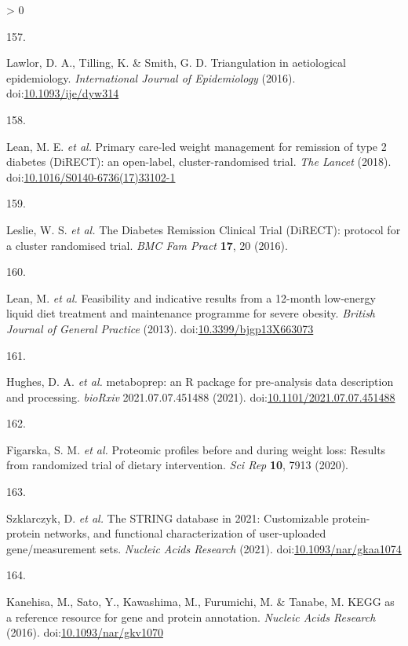 \documentclass[11pt,twoside]{bristolthesis}
\newlength{\cslhangindent}
\newlength{\csllabelwidth}
\newenvironment{CSLReferences}[2] %
 {%
  \setlength{\parindent}{0pt}
  \ifodd #1 \everypar{\setlength{\hangindent}{\cslhangindent}}\ignorespaces\fi
  \ifnum #2 > 0
  \setlength{\parskip}{#2\baselineskip}
  \fi
 }%
 {}
\newcommand{\CSLLeftMargin}[1]{\parbox[t]{\csllabelwidth}{#1}}
\newcommand{\CSLRightInline}[1]{\parbox[t]{\linewidth - \csllabelwidth}{#1}\break}
\begin{document}
\begin{CSLReferences}{0}{0}
\leavevmode\hypertarget{ref-Lawlor2016}{}%
\CSLLeftMargin{157. }
\CSLRightInline{Lawlor, D. A., Tilling, K. \& Smith, G. D. {Triangulation in aetiological epidemiology}. \emph{International Journal of Epidemiology} (2016). doi:\href{https://doi.org/10.1093/ije/dyw314}{10.1093/ije/dyw314}}

\leavevmode\hypertarget{ref-Lean2018}{}%
\CSLLeftMargin{158. }
\CSLRightInline{Lean, M. E. \emph{et al.} {Primary care-led weight management for remission of type 2 diabetes (DiRECT): an open-label, cluster-randomised trial}. \emph{The Lancet} (2018). doi:\href{https://doi.org/10.1016/S0140-6736(17)33102-1}{10.1016/S0140-6736(17)33102-1}}

\leavevmode\hypertarget{ref-Leslie2016}{}%
\CSLLeftMargin{159. }
\CSLRightInline{Leslie, W. S. \emph{et al.} {The Diabetes Remission Clinical Trial (DiRECT): protocol for a cluster randomised trial}. \emph{BMC Fam Pract} \textbf{17}, 20 (2016).}

\leavevmode\hypertarget{ref-Lean2013}{}%
\CSLLeftMargin{160. }
\CSLRightInline{Lean, M. \emph{et al.} {Feasibility and indicative results from a 12-month low-energy liquid diet treatment and maintenance programme for severe obesity}. \emph{British Journal of General Practice} (2013). doi:\href{https://doi.org/10.3399/bjgp13X663073}{10.3399/bjgp13X663073}}

\leavevmode\hypertarget{ref-Hughes2021}{}%
\CSLLeftMargin{161. }
\CSLRightInline{Hughes, D. A. \emph{et al.} {metaboprep: an R package for pre-analysis data description and processing}. \emph{bioRxiv} 2021.07.07.451488 (2021). doi:\href{https://doi.org/10.1101/2021.07.07.451488}{10.1101/2021.07.07.451488}}

\leavevmode\hypertarget{ref-Figarska2020}{}%
\CSLLeftMargin{162. }
\CSLRightInline{Figarska, S. M. \emph{et al.} {Proteomic profiles before and during weight loss: Results from randomized trial of dietary intervention}. \emph{Sci Rep} \textbf{10}, 7913 (2020).}

\leavevmode\hypertarget{ref-Szklarczyk2021}{}%
\CSLLeftMargin{163. }
\CSLRightInline{Szklarczyk, D. \emph{et al.} {The STRING database in 2021: Customizable protein-protein networks, and functional characterization of user-uploaded gene/measurement sets}. \emph{Nucleic Acids Research} (2021). doi:\href{https://doi.org/10.1093/nar/gkaa1074}{10.1093/nar/gkaa1074}}

\leavevmode\hypertarget{ref-Kanehisa2016}{}%
\CSLLeftMargin{164. }
\CSLRightInline{Kanehisa, M., Sato, Y., Kawashima, M., Furumichi, M. \& Tanabe, M. {KEGG as a reference resource for gene and protein annotation}. \emph{Nucleic Acids Research} (2016). doi:\href{https://doi.org/10.1093/nar/gkv1070}{10.1093/nar/gkv1070}}


\end{CSLReferences}
\end{document}
